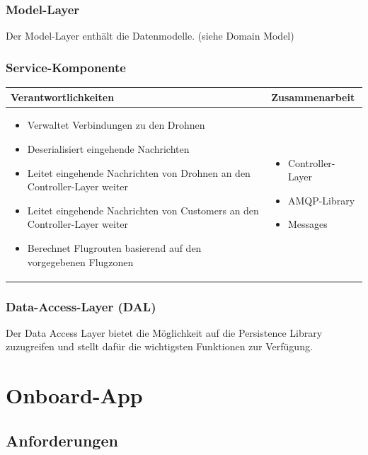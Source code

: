 \subsubsection{Model-Layer}

Der Model-Layer enthält die Datenmodelle. (siehe Domain Model)

\subsubsection{Service-Komponente}

\begin{tabular}{|p{}|p{}|} \hline
	\textbf{Verantwortlichkeiten} & \textbf{Zusammenarbeit} \\ \hline \hline
	
	\begin{itemize}
		\item Verwaltet Verbindungen zu den Drohnen
		\item Deserialisiert eingehende Nachrichten
		\item Leitet eingehende Nachrichten von Drohnen an den Controller-Layer weiter	
		\item Leitet eingehende Nachrichten von Customers an den Controller-Layer weiter	
		\item Berechnet Flugrouten basierend auf den vorgegebenen Flugzonen
	\end{itemize}&
	\begin{itemize}
		\item Controller-Layer
		\item AMQP-Library
		\item Messages
	\end{itemize}
	\\ \hline
\end{tabular}

\subsubsection{Data-Access-Layer (DAL)}

Der Data Access Layer bietet die Möglichkeit auf die Persistence Library zuzugreifen und stellt dafür die wichtigsten Funktionen zur Verfügung. 

\section{Onboard-App}

\subsection{Anforderungen}

